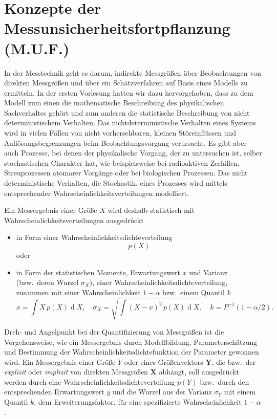 \section{Konzepte der Messunsicherheitsfortpflanzung (M.U.F.)}


In der Messtechnik geht es darum, indirekte Messgrößen über Beobachtungen von direkten
Messgrößen und über ein Schätzverfahren auf Basis eines Modells zu ermitteln.
In der ersten Vorlesung hatten wir dazu hervorgehoben, dass zu dem Modell zum einen
die mathematische Beschreibung des physikalischen Sachverhaltes gehört und zum anderen
die statistische Beschreibung von nicht deterministischem Verhalten.
Das nichtdeterministische Verhalten eines Systems wird in vielen Fällen
von nicht vorhersehbaren, kleinen Störeinflüssen und Auflösungsbegrenzungen
beim Beobachtungsvorgang verursacht. Es gibt aber auch Prozesse, bei denen
der physikalische Vorgang, der zu untersuchen ist, selber stochastischen Charakter hat,
wie beispielsweise bei radioaktiven Zerfällen, Streuprozessen atomarer Vorgänge oder bei
biologischen Prozessen. Das nicht deterministische Verhalten, die
Stochastik, eines Prozesses wird mittels entsprechender Wahrscheinlichkeitsverteilungen modelliert.

Ein Messergebnis einer Größe $X$ wird deshalb statistisch mit Wahrscheinlichkeitsverteilungen ausgedrückt
\begin{itemize}
\item in Form einer Wahrscheinlichkeitsdichteverteilung
$$
p(X)
$$
oder
\item in Form der statistischen Momente, Erwartungswert $x$ und Varianz (bzw.\ deren Wurzel $\sigma_X$),
einer Wahrscheinlichkeitsdichteverteilung, zusammen mit einer Wahrscheinlichkeit $1-\alpha$
bzw.\ einem Quantil $k$
$$
x = \int X \, p(X) \operatorname d X, \quad
\sigma_X = \sqrt{\int (X-x)^2 \, p(X) \operatorname d X}, \quad k = P^{-1}(1-\alpha/2).
$$
\end{itemize}
Dreh- und Angelpunkt bei der Quantifizierung von Messgrößen ist die Vorgehensweise, wie ein
Mess\-er\-gebnis durch Modellbildung, Parameterschätzung und Bestimmung der Wahrscheinlichkeitsdichtefunktion
der Parameter gewonnen wird. Ein Messergebnis einer Größe $Y$ oder eines Größenvektors
$\mathbf{Y}$, die bzw.\ der \textsl{explizit} oder \textsl{implizit} von direkten
Messgrößen $\mathbf{X}$ abhängt, soll ausgedrückt werden durch eine
Wahrscheinlichkeitsdichteverteilung $p(Y)$ bzw.\ durch den entsprechenden Erwartungswert $y$ und
die Wurzel aus der Varianz $\sigma_Y$ mit einem Quantil $k$, dem Erweiterungsfaktor, für
eine spezifizierte Wahrscheinlichkeit $1-\alpha$.

